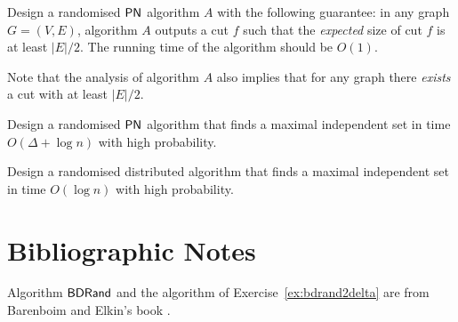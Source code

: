 \begin{ex}
    Design a randomised $\textup{\sffamily PN}$ algorithm $A$ with the following guarantee: in any graph $G = (V,E)$, algorithm $A$ outputs a cut $f$ such that the \emph{expected} size of cut $f$ is at least $|E|/2$. The running time of the algorithm should be $O(1)$.

    Note that the analysis of algorithm $A$ also implies that for any graph there \emph{exists} a cut with at least $|E|/2$.

\end{ex}

\begin{ex}
    Design a randomised $\textup{\sffamily PN}$ algorithm that finds a maximal independent set in time $O(\Delta + \log n)$ with high probability.

\end{ex}

\begin{exs}
    Design a randomised distributed algorithm that finds a maximal independent set in time $O(\log n)$ with high probability.

\end{exs}



\section{Bibliographic Notes}

Algorithm $\textup{\sffamily BDRand}$ and the algorithm of Exercise~\ref{ex:bdrand2delta} are from Barenboim and Elkin's book \cite[Section 10.1]{barenboim13distributed}.
